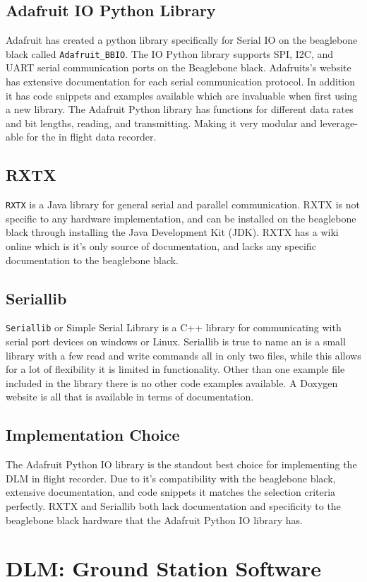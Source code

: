\documentclass[onecolumn, draftclsnofoot,10pt, compsoc]{IEEEtran}
\def\code#1{\texttt{#1}}
\begin{document}
\subsection{Adafruit IO Python Library}
Adafruit has created a python library specifically for Serial IO on the beaglebone black called \code{Adafruit\_BBIO}. The IO Python library supports SPI, I2C, and UART serial communication ports on the Beaglebone black. Adafruits's website has extensive documentation for each serial communication protocol. In addition it has code snippets and examples available which are invaluable when first using a new library. The Adafruit Python library has functions for different data rates and bit lengths, reading, and transmitting. Making it very modular and leverage-able for the in flight data recorder.
\subsection{RXTX}
\code{RXTX} is a Java library for general serial and parallel communication. RXTX is not specific to any hardware implementation, and can be installed on the beaglebone black through installing the Java Development Kit (JDK). RXTX has a wiki online which is it's only source of documentation, and lacks any specific documentation to the beaglebone black.
\subsection{Seriallib}
\code{Seriallib} or Simple Serial Library is a C++ library for communicating with serial port devices on windows or Linux. Seriallib is true to name an is a small library with a few read and write commands all in only two files, while this allows for a lot of flexibility it is limited in functionality. Other than one example file included in the library there is no other code examples available. A Doxygen website is all that is available in terms of documentation.
\subsection{Implementation Choice}
The Adafruit Python IO library is the standout best choice for implementing the DLM in flight recorder. Due to it's compatibility with the beaglebone black, extensive documentation, and code snippets it matches the selection criteria perfectly. RXTX and Seriallib both lack documentation and specificity to the beaglebone black hardware that the Adafruit Python IO library has.
\section{DLM: Ground Station Software}
\end{document}
